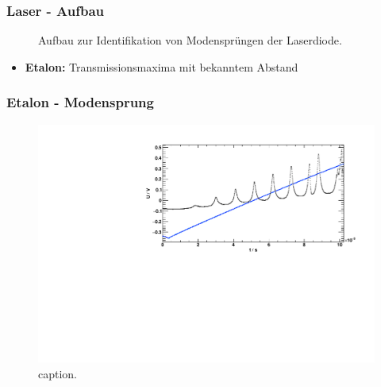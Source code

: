 \begin{frame}
\frametitle{Laser - Aufbau}

\begin{figure}
    \centering
    \def\svgwidth{\textwidth}
    
    \caption{Aufbau zur Identifikation von Modensprüngen der Laserdiode.}
\end{figure}

\begin{itemize}
  \item \textbf{Etalon:} Transmissionsmaxima mit bekanntem Abstand
\end{itemize}

\end{frame}


\begin{frame}
\frametitle{Etalon - Modensprung}

\begin{figure}[H]
    \begin{center}
        \includegraphics[width=\textwidth]{../img/up-etalon_zoom.pdf}
        \caption{caption.}
    \end{center}
\end{figure}


\end{frame}
